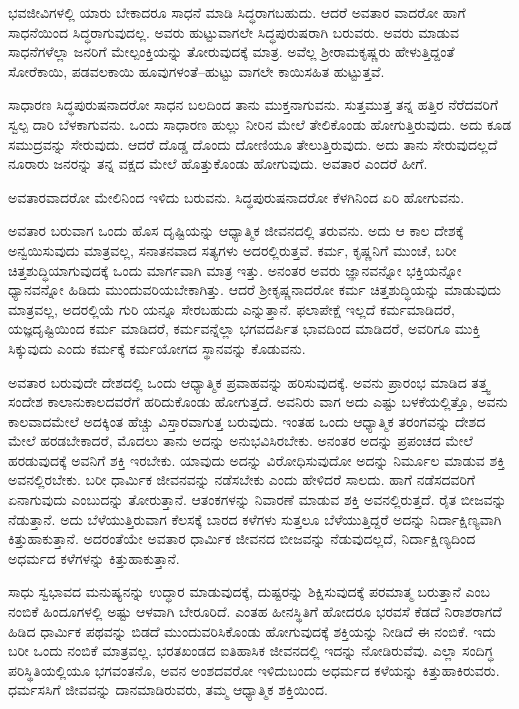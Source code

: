ಭವಜೀವಿಗಳಲ್ಲಿ ಯಾರು ಬೇಕಾದರೂ ಸಾಧನೆ ಮಾಡಿ ಸಿದ್ಧರಾಗಬಹುದು. ಆದರೆ ಅವತಾರ ವಾದರೋ ಹಾಗೆ ಸಾಧನೆಯಿಂದ ಸಿದ್ಧರಾಗುವುದಲ್ಲ. ಅವರು ಹುಟ್ಟುವಾಗಲೇ ಸಿದ್ಧಪುರುಷರಾಗಿ ಬರುವರು. ಅವರು ಮಾಡುವ ಸಾಧನೆಗಳೆಲ್ಲಾ ಜನರಿಗೆ ಮೇಲ್ಪಂಕ್ತಿಯನ್ನು ತೋರುವುದಕ್ಕೆ ಮಾತ್ರ. ಅವೆಲ್ಲ ಶ‍್ರೀರಾಮಕೃಷ್ಣರು ಹೇಳುತ್ತಿದ್ದಂತೆ ಸೋರೆಕಾಯಿ, ಪಡವಲಕಾಯಿ ಹೂವುಗಳಂತೆ–ಹುಟ್ಟು ವಾಗಲೇ ಕಾಯಿಸಹಿತ ಹುಟ್ಟುತ್ತವೆ.

ಸಾಧಾರಣ ಸಿದ್ಧಪುರುಷನಾದರೋ ಸಾಧನ ಬಲದಿಂದ ತಾನು ಮುಕ್ತನಾಗುವನು. ಸುತ್ತಮುತ್ತ ತನ್ನ ಹತ್ತಿರ ನೆರೆದವರಿಗೆ ಸ್ವಲ್ಪ ದಾರಿ ಬೆಳಕಾಗುವನು. ಒಂದು ಸಾಧಾರಣ ಹುಲ್ಲು ನೀರಿನ ಮೇಲೆ ತೇಲಿಕೊಂಡು ಹೋಗುತ್ತಿರುವುದು. ಅದು ಕೂಡ ಸಮುದ್ರವನ್ನು ಸೇರುವುದು. ಆದರೆ ದೊಡ್ಡ ದೊಂದು ದೋಣಿಯೂ ತೇಲುತ್ತಿರುವುದು. ಅದು ತಾನು ಸೇರುವುದಲ್ಲದೆ ನೂರಾರು ಜನರನ್ನು ತನ್ನ ವಕ್ಷದ ಮೇಲೆ ಹೊತ್ತುಕೊಂಡು ಹೋಗುವುದು. ಅವತಾರ ಎಂದರೆ ಹೀಗೆ.

ಅವತಾರವಾದರೋ ಮೇಲಿನಿಂದ ಇಳಿದು ಬರುವನು. ಸಿದ್ಧಪುರುಷನಾದರೋ ಕೆಳಗಿನಿಂದ ಏರಿ ಹೋಗುವನು.

ಅವತಾರ ಬರುವಾಗ ಒಂದು ಹೊಸ ದೃಷ್ಟಿಯನ್ನು ಆಧ್ಯಾತ್ಮಿಕ ಜೀವನದಲ್ಲಿ ತರುವನು. ಅದು ಆ ಕಾಲ ದೇಶಕ್ಕೆ ಅನ್ವಯಿಸುವುದು ಮಾತ್ರವಲ್ಲ, ಸನಾತನವಾದ ಸತ್ಯಗಳು ಅದರಲ್ಲಿರುತ್ತವೆ. ಕರ್ಮ, ಕೃಷ್ಣನಿಗೆ ಮುಂಚೆ, ಬರೀ ಚಿತ್ತಶುದ್ಧಿಯಾಗುವುದಕ್ಕೆ ಒಂದು ಮಾರ್ಗವಾಗಿ ಮಾತ್ರ ಇತ್ತು. ಅನಂತರ ಅವರು ಜ್ಞಾನವನ್ನೋ ಭಕ್ತಿಯನ್ನೋ ಧ್ಯಾನವನ್ನೋ ಹಿಡಿದು ಮುಂದುವರಿಯಬೇಕಾಗಿತ್ತು. ಆದರೆ ಶ‍್ರೀಕೃಷ್ಣನಾದರೋ ಕರ್ಮ ಚಿತ್ತಶುದ್ಧಿಯನ್ನು ಮಾಡುವುದು ಮಾತ್ರವಲ್ಲ, ಅದರಲ್ಲಿಯೆ ಗುರಿ ಯನ್ನೂ ಸೇರಬಹುದು ಎನ್ನುತ್ತಾನೆ. ಫಲಾಪೇಕ್ಷೆ ಇಲ್ಲದೆ ಕರ್ಮಮಾಡಿದರೆ, ಯಜ್ಞದೃಷ್ಟಿಯಿಂದ ಕರ್ಮ ಮಾಡಿದರೆ, ಕರ್ಮವನ್ನೆಲ್ಲಾ ಭಗವದರ್ಪಿತ ಭಾವದಿಂದ ಮಾಡಿದರೆ, ಅವರಿಗೂ ಮುಕ್ತಿ ಸಿಕ್ಕುವುದು ಎಂದು ಕರ್ಮಕ್ಕೆ ಕರ್ಮಯೋಗದ ಸ್ಥಾನವನ್ನು ಕೊಡುವನು.

ಅವತಾರ ಬರುವುದೇ ದೇಶದಲ್ಲಿ ಒಂದು ಆಧ್ಯಾತ್ಮಿಕ ಪ್ರವಾಹವನ್ನು ಹರಿಸುವುದಕ್ಕೆ. ಅವನು ಪ್ರಾರಂಭ ಮಾಡಿದ ತತ್ತ್ವ ಸಂದೇಶ ಕಾಲಾನುಕಾಲದವರೆಗೆ ಹರಿದುಕೊಂಡು ಹೋಗುತ್ತದೆ. ಅವನಿರು ವಾಗ ಅದು ಎಷ್ಟು ಬಳಕೆಯಲ್ಲಿತ್ತೊ, ಅವನು ಕಾಲವಾದಮೇಲೆ ಅದಕ್ಕಿಂತ ಹೆಚ್ಚು ವಿಸ್ತಾರವಾಗುತ್ತ ಬರುವುದು. ಇಂತಹ ಒಂದು ಆಧ್ಯಾತ್ಮಿಕ ತರಂಗವನ್ನು ದೇಶದ ಮೇಲೆ ಹರಡಬೇಕಾದರೆ, ಮೊದಲು ತಾನು ಅದನ್ನು ಅನುಭವಿಸಿರಬೇಕು. ಅನಂತರ ಅದನ್ನು ಪ್ರಪಂಚದ ಮೇಲೆ ಹರಡುವುದಕ್ಕೆ ಅವನಿಗೆ ಶಕ್ತಿ ಇರಬೇಕು. ಯಾವುದು ಅದನ್ನು ವಿರೋಧಿಸುವುದೋ ಅದನ್ನು ನಿರ್ಮೂಲ ಮಾಡುವ ಶಕ್ತಿ ಅವನಲ್ಲಿರಬೇಕು. ಬರೀ ಧಾರ್ಮಿಕ ಜೀವನವನ್ನು ನಡೆಸಬೇಕು ಎಂದು ಹೇಳಿದರೆ ಸಾಲದು. ಹಾಗೆ ನಡೆಸದವರಿಗೆ ಏನಾಗುವುದು ಎಂಬುದನ್ನು ತೋರುತ್ತಾನೆ. ಆತಂಕಗಳನ್ನು ನಿವಾರಣೆ ಮಾಡುವ ಶಕ್ತಿ ಅವನಲ್ಲಿರುತ್ತದೆ. ರೈತ ಬೀಜವನ್ನು ನೆಡುತ್ತಾನೆ. ಅದು ಬೆಳೆಯುತ್ತಿರುವಾಗ ಕೆಲಸಕ್ಕೆ ಬಾರದ ಕಳೆಗಳು ಸುತ್ತಲೂ ಬೆಳೆಯುತ್ತಿದ್ದರೆ ಅದನ್ನು ನಿರ್ದಾಕ್ಷಿಣ್ಯವಾಗಿ ಕಿತ್ತುಹಾಕುತ್ತಾನೆ. ಅದರಂತೆಯೇ ಅವತಾರ ಧಾರ್ಮಿಕ ಜೀವನದ ಬೀಜವನ್ನು ನೆಡುವುದಲ್ಲದೆ, ನಿರ್ದಾಕ್ಷಿಣ್ಯದಿಂದ ಅಧರ್ಮದ ಕಳೆಗಳನ್ನು ಕಿತ್ತುಹಾಕುತ್ತಾನೆ.

ಸಾಧು ಸ್ವಭಾವದ ಮನುಷ್ಯನನ್ನು ಉದ್ಧಾರ ಮಾಡುವುದಕ್ಕೆ, ದುಷ್ಟರನ್ನು ಶಿಕ್ಷಿಸುವುದಕ್ಕೆ ಪರಮಾತ್ಮ ಬರುತ್ತಾನೆ ಎಂಬ ನಂಬಿಕೆ ಹಿಂದೂಗಳಲ್ಲಿ ಅಷ್ಟು ಆಳವಾಗಿ ಬೇರೂರಿದೆ. ಎಂತಹ ಹೀನಸ್ಥಿತಿಗೆ ಹೋದರೂ ಭರವಸೆ ಕೆಡದೆ ನಿರಾಶರಾಗದೆ ಹಿಡಿದ ಧಾರ್ಮಿಕ ಪಥವನ್ನು ಬಿಡದೆ ಮುಂದುವರಿಸಿಕೊಂಡು ಹೋಗುವುದಕ್ಕೆ ಶಕ್ತಿಯನ್ನು ನೀಡಿದೆ ಈ ನಂಬಿಕೆ. ಇದು ಬರೀ ಒಂದು ನಂಬಿಕೆ ಮಾತ್ರವಲ್ಲ. ಭರತಖಂಡದ ಐತಿಹಾಸಿಕ ಜೀವನದಲ್ಲಿ ಇದನ್ನು ನೋಡಿರುವೆವು. ಎಲ್ಲಾ ಸಂದಿಗ್ಧ ಪರಿಸ್ಥಿತಿಯಲ್ಲಿಯೂ ಭಗವಂತನೊ, ಅವನ ಅಂಶದವರೋ ಇಳಿದುಬಂದು ಅಧರ್ಮದ ಕಳೆಯನ್ನು ಕಿತ್ತುಹಾಕಿರುವರು. ಧರ್ಮಸಸಿಗೆ ಜೀವವನ್ನು ದಾನಮಾಡಿರುವರು, ತಮ್ಮ ಆಧ್ಯಾತ್ಮಿಕ ಶಕ್ತಿಯಿಂದ.


